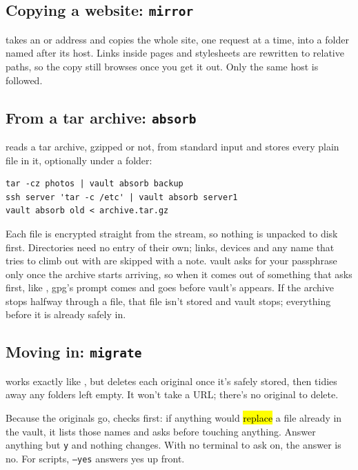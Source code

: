 \documentclass[10pt,oneside,openany]{book}
\begin{document}
\subsection{Copying a website: \texttt{mirror}}
 takes an  or  address and copies
the whole site, one request at a time, into a folder named after its host.
Links inside pages and stylesheets are rewritten to relative paths, so the
copy still browses once you get it out. Only the same host is followed.


\subsection{From a tar archive: \texttt{absorb}}
 reads a tar archive, gzipped or not, from standard input and
stores every plain file in it, optionally under a folder:

\begin{verbatim}
tar -cz photos | vault absorb backup
ssh server 'tar -c /etc' | vault absorb server1
vault absorb old < archive.tar.gz
\end{verbatim}

Each file is encrypted straight from the stream, so nothing is unpacked to
disk first. Directories need no entry of their own; links, devices and any
name that tries to climb out with  are skipped with a note.
vault asks for your passphrase only once the archive starts arriving, so
when it comes out of something that asks first, like
, gpg's prompt comes
and goes before vault's appears. If the
archive stops halfway through a file, that file isn't stored and vault
stops; everything before it is already safely in.


\subsection{Moving in: \texttt{migrate}}
 works exactly like , but deletes each original once
it's safely stored, then tidies away any folders left empty. It won't take a
URL; there's no original to delete.

Because the originals go,  checks first: if anything would
\hl{replace} a file already in the vault, it lists those names and asks
before touching anything. Answer anything but \texttt{y} and nothing changes.
With no terminal to ask on, the answer is no. For scripts, \texttt{--yes}
answers yes up front.
\end{document}
